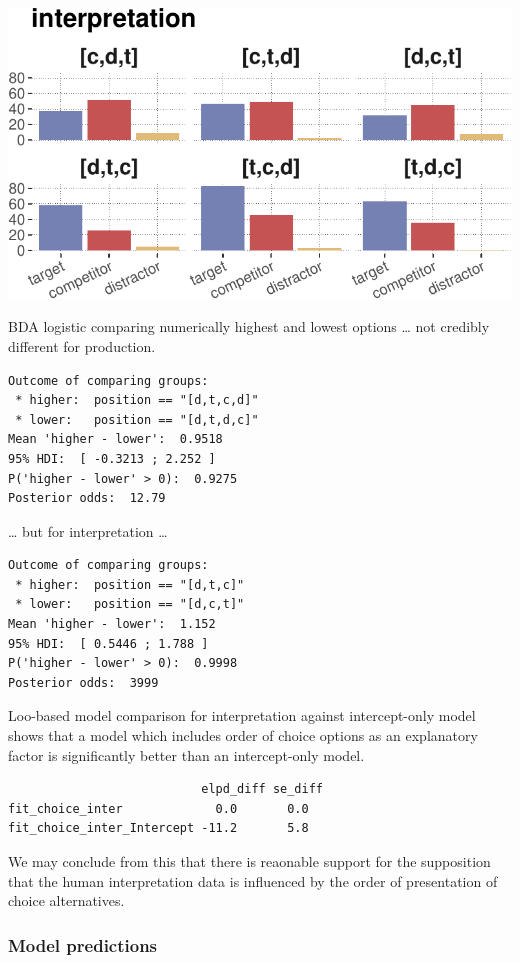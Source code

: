\documentclass{article}
\begin{document}
\includegraphics{00-pics/human-data-counts-per-choiceOrder-2.pdf}

BDA logistic comparing numerically highest and lowest options \ldots{}
not credibly different for production.

\begin{verbatim}
Outcome of comparing groups:
 * higher:  position == "[d,t,c,d]"
 * lower:   position == "[d,t,d,c]"
Mean 'higher - lower':  0.9518
95% HDI:  [ -0.3213 ; 2.252 ]
P('higher - lower' > 0):  0.9275
Posterior odds:  12.79
\end{verbatim}

\ldots{} but for interpretation \ldots{}

\begin{verbatim}
Outcome of comparing groups:
 * higher:  position == "[d,t,c]"
 * lower:   position == "[d,c,t]"
Mean 'higher - lower':  1.152
95% HDI:  [ 0.5446 ; 1.788 ]
P('higher - lower' > 0):  0.9998
Posterior odds:  3999
\end{verbatim}

Loo-based model comparison for interpretation against intercept-only
model shows that a model which includes order of choice options as an
explanatory factor is significantly better than an intercept-only model.

\begin{verbatim}
                           elpd_diff se_diff
fit_choice_inter             0.0       0.0
fit_choice_inter_Intercept -11.2       5.8
\end{verbatim}

We may conclude from this that there is reaonable support for the
supposition that the human interpretation data is influenced by the
order of presentation of choice alternatives.

\hypertarget{model-predictions-1}{%
\subsubsection{Model predictions}\label{model-predictions-1}}
\end{document}
